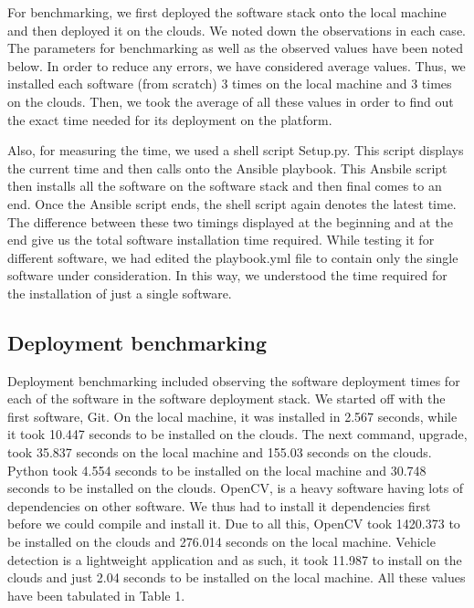 \documentclass[9pt,twocolumn,twoside]{../../styles/osajnl}
\begin{document}
For benchmarking, we first deployed the software stack onto the local
machine and then deployed it on the clouds.  We noted down the
observations in each case.  The parameters for benchmarking as well as
the observed values have been noted below.  In order to reduce any
errors, we have considered average values.  Thus, we installed each
software (from scratch) 3 times on the local machine and 3 times on
the clouds.  Then, we took the average of all these values in order to
find out the exact time needed for its deployment on the platform.

Also, for measuring the time, we used a shell script Setup.py.  This script displays the current time and then calls onto the Ansible playbook.  This Ansbile script then installs all the software on the software stack and then final comes to an end.  Once the Ansible script ends, the shell script again denotes the latest time.  The difference between these two timings displayed at the beginning and at the end give us the total software installation time required.  While testing it for different software, we had edited the playbook.yml file to contain only the single software under consideration.  In this way, we understood the time required for the installation of just a single software.  

\subsection{Deployment benchmarking}
Deployment benchmarking included observing the software deployment
times for each of the software in the software deployment stack.  We
started off with the first software, Git.  On the local machine, it
was installed in 2.567 seconds, while it took 10.447 seconds to be
installed on the clouds.  The next command, upgrade, took 35.837
seconds on the local machine and 155.03 seconds on the clouds.  Python
took 4.554 seconds to be installed on the local machine and 30.748
seconds to be installed on the clouds.  OpenCV, is a heavy software
having lots of dependencies on other software.  We thus had to
install it dependencies first before we could compile and install it.
Due to all this, OpenCV took 1420.373 to be installed on the clouds
and 276.014 seconds on the local machine.  Vehicle detection is a
lightweight application and as such, it took 11.987 to install on the
clouds and just 2.04 seconds to be installed on the local machine.
All these values have been tabulated in Table 1.
\end{document}
